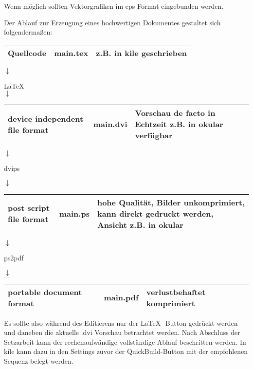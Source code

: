 Wenn möglich sollten Vektorgrafiken im eps Format eingebunden werden.

Der Ablauf zur Erzeugung eines hochwertigen Dokumentes gestaltet sich folgendermaßen:


\begin{center}

 \begin{tabular}{|C{50mm}|C{30mm}|p{50mm}|}
  \hline
  Quellcode & main.tex & z.B. in kile geschrieben\\
  \hline
 \end{tabular}
 
 $\downarrow$
 
  \LaTeX \\
 
 $\downarrow$
 
 \begin{tabular}{|C{50mm}|C{30mm}|p{50mm}|}
  \hline
  device independent file format & main.dvi & Vorschau de facto in Echtzeit z.B. in okular verfügbar\\
  \hline
 \end{tabular}
 
 $\downarrow$
 
 dvips
 
 $\downarrow$
 
 \begin{tabular}{|C{50mm}|C{30mm}|p{50mm}|}
  \hline
  post script file format & main.ps & hohe Qualität, Bilder unkomprimiert, kann direkt gedruckt werden, Ansicht z.B. in okular\\
  \hline
 \end{tabular}
 
 $\downarrow$
 
 ps2pdf
 
 $\downarrow$
 
  \begin{tabular}{|C{50mm}|C{30mm}|p{50mm}|}
  \hline
  portable document format & main.pdf & verlustbehaftet komprimiert\\
  \hline
 \end{tabular}
 
\end{center}

Es sollte also während des Editierens nur der \LaTeX - Button gedrückt werden und daneben die aktuelle .dvi Vorschau betrachtet werden.
Nach Abschluss der Setzarbeit kann der rechenaufwändige vollständige Ablauf beschritten werden.
In kile kann dazu in den Settings zuvor der QuickBuild-Button mit der empfohlenen Sequenz belegt werden.

